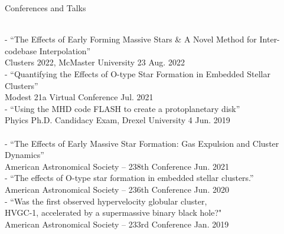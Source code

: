 \documentclass{resume} %
\newcommand{\forceindent}{\leavevmode{\parindent=1em\indent}}
\begin{document}

\begin{rSection}{Conferences and Talks}

\underline{}\\
- ``The Effects of Early Forming Massive Stars \& A Novel Method for Inter-codebase Interpolation''\\
\forceindent Clusters 2022, McMaster University \hfill 23 Aug. 2022\\
- ``Quantifying the Effects of O-type Star Formation in Embedded Stellar Clusters''\\
\forceindent Modest 21a Virtual Conference \hfill Jul. 2021\\
- ``Using the MHD code FLASH to create a protoplanetary disk''\\
\forceindent Phyics Ph.D. Candidacy Exam, Drexel University \hfill 4 Jun. 2019\\

\underline{}\\
- ``The Effects of Early Massive Star Formation: Gas Expulsion and Cluster Dynamics''\\
\forceindent American Astronomical Society -- 238th Conference \hfill Jun. 2021\\
- ``The effects of O-type star formation in embedded stellar clusters.''\\
\forceindent American Astronomical Society -- 236th Conference \hfill Jun. 2020\\
- ``Was the first observed hypervelocity globular cluster, \\ \forceindent HVGC-1, accelerated by a supermassive binary black hole?"\\
\forceindent American Astronomical Society -- 233rd Conference \hfill Jan. 2019\\

\end{rSection}
\end{document}
